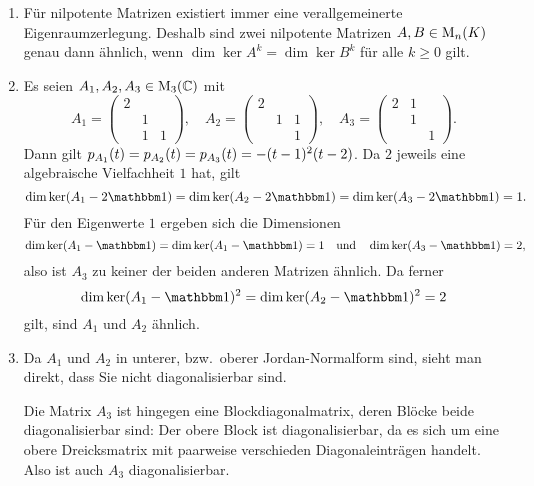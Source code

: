 \begin{example}
  \leavevmode
  \begin{enumerate}
    \item
      Für nilpotente Matrizen existiert immer eine verallgemeinerte Eigenraumzerlegung.
      Deshalb sind zwei nilpotente Matrizen $A, B \in \operatorname{M}_{n}(K)$ genau dann ähnlich, wenn $\dim \ker A^k = \dim \ker B^k$ für alle $k \geq 0$ gilt.
    \item
      Es seien $A_1, A_2, A_3 \in \operatorname{M}_{3}(\mathbb{C})$ mit
      \[
          A_1
        = \begin{pmatrix}
            2 &   &   \\
              & 1 &   \\
              & 1 & 1
          \end{pmatrix},
        \quad
          A_2
        = \begin{pmatrix}
            2 &   &   \\
              & 1 & 1 \\
              &   & 1
          \end{pmatrix},
        \quad
          A_3
        = \begin{pmatrix}
            2 & 1 &   \\
              & 1 &   \\
              &   & 1
          \end{pmatrix}.
      \]
      Dann gilt $p_{A_1}(t) = p_{A_2}(t) = p_{A_3}(t) = - (t-1)^2 (t-2)$.
      Da $2$ jeweils eine algebraische Vielfachheit $1$ hat, gilt
      \[
          \dim \ker (A_1 - 2 \Id)
        = \dim \ker (A_2 - 2 \Id)
        = \dim \ker (A_3 - 2 \Id)
        = 1.
      \]
      Für den Eigenwerte $1$ ergeben sich die Dimensionen
      \[
          \dim \ker (A_1 - \Id)
        = \dim \ker (A_1 - \Id)
        = 1
        \quad\text{und}\quad
          \dim \ker (A_3 - \Id)
       = 2,
      \]
      also ist $A_3$ zu keiner der beiden anderen Matrizen ähnlich.
      Da ferner
      \[
          \dim \ker (A_1 - \Id)^2
        = \dim \ker (A_2 - \Id)^2
        = 2
      \]
      gilt, sind $A_1$ und $A_2$ ähnlich.
      
    \item
      Da $A_1$ und $A_2$ in unterer, bzw.\ oberer Jordan-Normalform sind, sieht man direkt, dass Sie nicht diagonalisierbar sind.
      
      Die Matrix $A_3$ ist hingegen eine Blockdiagonalmatrix, deren Blöcke beide diagonalisierbar sind:
      Der obere Block ist diagonalisierbar, da es sich um eine obere Dreicksmatrix mit paarweise verschieden Diagonaleinträgen handelt.
      Also ist auch $A_3$ diagonalisierbar.
      

\end{enumerate}
\end{example}
